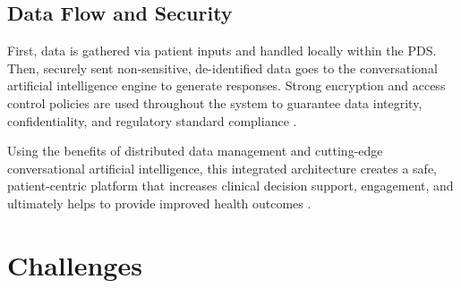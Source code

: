 \subsection{Data Flow and Security}
First, data is gathered via patient inputs and handled locally within the PDS. Then, securely sent non-sensitive, de-identified data goes to the conversational artificial intelligence engine to generate responses. Strong encryption and access control policies are used throughout the system to guarantee data integrity, confidentiality, and regulatory standard compliance \cite{eu2016, hipaa1996}.

Using the benefits of distributed data management and cutting-edge conversational artificial intelligence, this integrated architecture creates a safe, patient-centric platform that increases clinical decision support, engagement, and ultimately helps to provide improved health outcomes \cite{montagna2023}.

\section{Challenges}
\label{sec:challenges}

